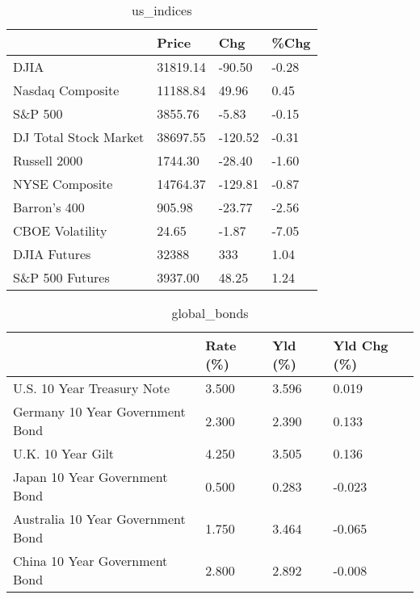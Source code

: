\documentclass{article}%
\begin{document}
%


\begin{table}[htbp]%
\caption{us\_indices}%
\centering%
\begin{adjustbox}{width=1\textwidth}%
\begin{tabular}{llll}
\toprule
                      &    Price &     Chg &  \%Chg \\
\midrule
                 DJIA & 31819.14 &  -90.50 & -0.28 \\
     Nasdaq Composite & 11188.84 &   49.96 &  0.45 \\
              S\&P 500 &  3855.76 &   -5.83 & -0.15 \\
DJ Total Stock Market & 38697.55 & -120.52 & -0.31 \\
         Russell 2000 &  1744.30 &  -28.40 & -1.60 \\
       NYSE Composite & 14764.37 & -129.81 & -0.87 \\
         Barron's 400 &   905.98 &  -23.77 & -2.56 \\
      CBOE Volatility &    24.65 &   -1.87 & -7.05 \\
         DJIA Futures &    32388 &     333 &  1.04 \\
      S\&P 500 Futures &  3937.00 &   48.25 &  1.24 \\
\bottomrule
\end{tabular}
%
\end{adjustbox}%
\end{table}

%


\begin{table}[htbp]%
\caption{global\_bonds}%
\centering%
\begin{adjustbox}{width=1\textwidth}%
\begin{tabular}{llll}
\toprule
                                  & Rate (\%) & Yld (\%) & Yld Chg (\%) \\
\midrule
       U.S. 10 Year Treasury Note &    3.500 &   3.596 &       0.019 \\
  Germany 10 Year Government Bond &    2.300 &   2.390 &       0.133 \\
                U.K. 10 Year Gilt &    4.250 &   3.505 &       0.136 \\
    Japan 10 Year Government Bond &    0.500 &   0.283 &      -0.023 \\
Australia 10 Year Government Bond &    1.750 &   3.464 &      -0.065 \\
    China 10 Year Government Bond &    2.800 &   2.892 &      -0.008 \\
\bottomrule
\end{tabular}
%
\end{adjustbox}%
\end{table}
\end{document}
